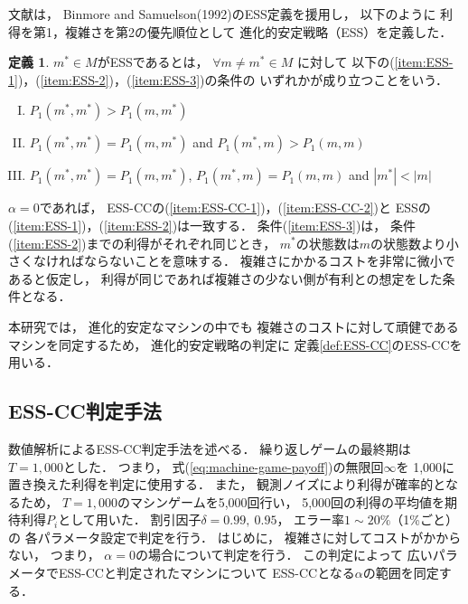 \documentclass[submit]{ipsj}
\theoremstyle{definition}
\newtheorem{definition}{定義}
\begin{document}
文献\cite{koike-2022}は，
Binmore and Samuelson(1992)のESS定義を援用し，
以下のように
利得を第1，複雑さを第2の優先順位として
進化的安定戦略（ESS）を定義した．
\begin{definition} \label{def:ESS}
  $m^{\ast} \in M$がESSであるとは，
  $\forall m \neq m^{\ast} \in M$ に対して
  以下の(\ref{item:ESS-1})，(\ref{item:ESS-2})，(\ref{item:ESS-3})の条件の
  いずれかが成り立つことをいう．
  \begin{enumerate}[(I)]
    \item $P_1(m^{\ast}, m^{\ast}) > P_1(m, m^{\ast})$ \label{item:ESS-1}
    \item $P_1(m^{\ast}, m^{\ast}) = P_1(m, m^{\ast})$ and $P_1(m^{\ast}, m) > P_1(m, m)$ \label{item:ESS-2}
    \item $P_1(m^{\ast}, m^{\ast}) = P_1(m, m^{\ast})$, $P_1(m^{\ast}, m) = P_1(m, m)$ and $|m^{\ast}| < |m|$ \label{item:ESS-3}
  \end{enumerate}
\end{definition}

$\alpha = 0$であれば，
ESS-CCの(\ref{item:ESS-CC-1})，(\ref{item:ESS-CC-2})と
ESSの(\ref{item:ESS-1})，(\ref{item:ESS-2})は一致する．
条件(\ref{item:ESS-3})は，
条件(\ref{item:ESS-2})までの利得がそれぞれ同じとき，
$m^{\ast}$の状態数は$m$の状態数より小さくなければならないことを意味する．
複雑さにかかるコストを非常に微小であると仮定し，
利得が同じであれば複雑さの少ない側が有利との想定をした条件となる．

本研究では，
進化的安定なマシンの中でも
複雑さのコストに対して頑健であるマシンを同定するため，
進化的安定戦略の判定に
定義\ref{def:ESS-CC}のESS-CCを用いる．

\subsection{ESS-CC判定手法} \label{sec:judge-method-ESS-CC}

数値解析によるESS-CC判定手法を述べる．
繰り返しゲームの最終期は$T = 1,000$とした．
つまり，
式(\ref{eq:machine-game-payoff})の無限回$\infty$を
1,000に置き換えた利得を判定に使用する．
また，
観測ノイズにより利得が確率的となるため，
$T = 1,000$のマシンゲームを5,000回行い，
5,000回の利得の平均値を期待利得$P_i$として用いた．
割引因子$\delta = 0.99, \ 0.95$，
エラー率$1 \sim 20 \%$（1\%ごと）の
各パラメータ設定で判定を行う．
はじめに，
複雑さに対してコストがかからない，
つまり，
$\alpha = 0$の場合について判定を行う．
この判定によって
広いパラメータでESS-CCと判定されたマシンについて
ESS-CCとなる$\alpha$の範囲を同定する．
\end{document}
